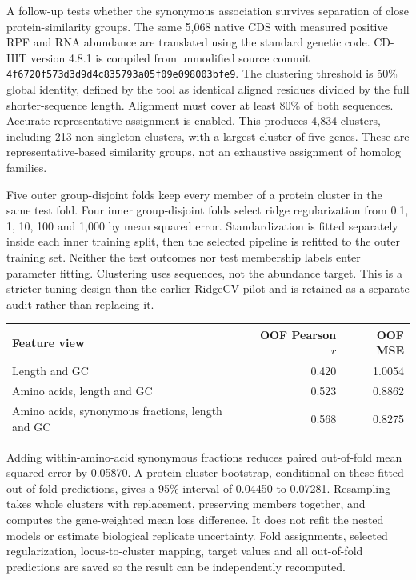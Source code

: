 A follow-up tests whether the synonymous association survives separation of close protein-similarity groups. The same 5,068 native CDS with measured positive RPF and RNA abundance are translated using the standard genetic code. CD-HIT version 4.8.1 is compiled from unmodified source commit \texttt{4f6720f573d3d9d4}\allowbreak\texttt{c835793a05f09e098003bfe9}. The clustering threshold is 50\% global identity, defined by the tool as identical aligned residues divided by the full shorter-sequence length. Alignment must cover at least 80\% of both sequences. Accurate representative assignment is enabled. This produces 4,834 clusters, including 213 non-singleton clusters, with a largest cluster of five genes. These are representative-based similarity groups, not an exhaustive assignment of homolog families.

Five outer group-disjoint folds keep every member of a protein cluster in the same test fold. Four inner group-disjoint folds select ridge regularization from 0.1, 1, 10, 100 and 1,000 by mean squared error. Standardization is fitted separately inside each inner training split, then the selected pipeline is refitted to the outer training set. Neither the test outcomes nor test membership labels enter parameter fitting. Clustering uses sequences, not the abundance target. This is a stricter tuning design than the earlier RidgeCV pilot and is retained as a separate audit rather than replacing it.

\begin{center}\begin{tabular}{lrr}\hline
Feature view & OOF Pearson $r$ & OOF MSE\\\hline
Length and GC & 0.420 & 1.0054\\
Amino acids, length and GC & 0.523 & 0.8862\\
Amino acids, synonymous fractions, length and GC & 0.568 & 0.8275\\\hline
\end{tabular}\end{center}

Adding within-amino-acid synonymous fractions reduces paired out-of-fold mean squared error by 0.05870. A protein-cluster bootstrap, conditional on these fitted out-of-fold predictions, gives a 95\% interval of 0.04450 to 0.07281. Resampling takes whole clusters with replacement, preserving members together, and computes the gene-weighted mean loss difference. It does not refit the nested models or estimate biological replicate uncertainty. Fold assignments, selected regularization, locus-to-cluster mapping, target values and all out-of-fold predictions are saved so the result can be independently recomputed.

